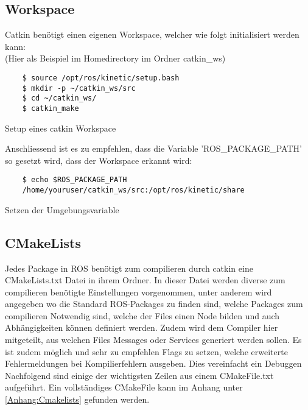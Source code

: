 \subsection{Workspace}
Catkin benötigt einen eigenen Workspace, welcher wie folgt initialisiert werden kann: \\
(Hier als Beispiel im Homedirectory im Ordner catkin\_ws)

\begin{code}
	\begin{verbatim}
	$ source /opt/ros/kinetic/setup.bash
	$ mkdir -p ~/catkin_ws/src
	$ cd ~/catkin_ws/
	$ catkin_make
	\end{verbatim}
	\vspace{-15pt}
	\caption{Setup eines catkin Workspace}
	\label{code:CatkinWS}
\end{code}
Anschliessend ist es zu empfehlen, dass die Variable 'ROS\_PACKAGE\_PATH' so gesetzt wird, dass der Workspace erkannt wird:

\begin{code}
	\begin{verbatim}
	$ echo $ROS_PACKAGE_PATH
	/home/youruser/catkin_ws/src:/opt/ros/kinetic/share
	\end{verbatim}
	\vspace{-15pt}
	\caption{Setzen der Umgebungsvariable}
	\label{code:PathVariable}
\end{code}

\subsection{CMakeLists}\label{Anhang:catkinCMakeLists}
Jedes Package in ROS benötigt zum compilieren durch catkin eine CMakeLists.txt Datei in ihrem Ordner. In dieser Datei werden diverse zum compilieren benötigte Einstellungen vorgenommen, unter anderem wird angegeben wo die Standard ROS-Packages zu finden sind, welche Packages zum compilieren Notwendig sind, welche der Files einen Node bilden und auch Abhängigkeiten können definiert werden. Zudem wird dem Compiler hier mitgeteilt, aus welchen Files Messages oder Services generiert werden sollen. Es ist zudem möglich und sehr zu empfehlen Flags zu setzen, welche erweiterte Fehlermeldungen bei Kompilierfehlern ausgeben. Dies vereinfacht ein Debuggen Nachfolgend sind einige der wichtigsten Zeilen aus einem CMakeFile.txt aufgeführt. Ein vollständiges CMakeFile kann im Anhang unter \ref{Anhang:Cmakelists} gefunden werden. \cite{Allen2016} \\

